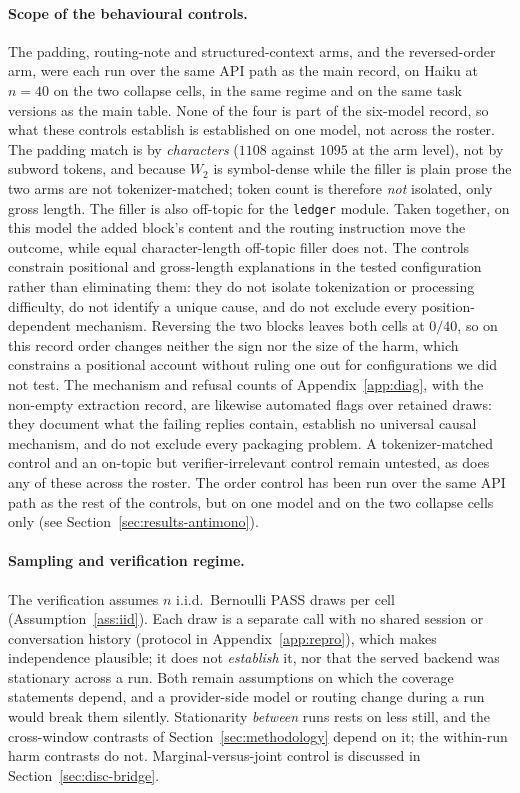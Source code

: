 \documentclass[11pt]{article}
\theoremstyle{plain}
\theoremstyle{definition}
\theoremstyle{remark}
\begin{document}
\paragraph{Scope of the behavioural controls.} The padding, routing-note and structured-context
arms, and the reversed-order arm, were each run over the same API path as the main record, on
Haiku at $n=40$ on the two collapse
cells, in the same regime and on the same task versions as the main table. None of the four is part of the six-model
record, so what these controls establish is established on one model, not across the roster. The
padding match is by \emph{characters} ($1108$ against $1095$ at the arm level), not by subword
tokens, and because $W_2$ is symbol-dense while the filler is plain prose the two arms are not
tokenizer-matched; token count is therefore \emph{not} isolated, only gross length. The filler is
also off-topic for the \texttt{ledger} module. Taken together, on this model the added block's
content and the routing instruction move the outcome, while equal character-length off-topic
filler does not. The controls constrain positional and gross-length explanations in the tested
configuration rather than eliminating them: they do not isolate tokenization or processing
difficulty, do not identify a unique cause, and do not exclude every position-dependent
mechanism. Reversing the two blocks leaves both cells at $0/40$, so on this record order changes
neither the sign nor the size of the harm, which constrains a positional account without ruling
one out for configurations we did not test. The mechanism and
refusal counts of Appendix~\ref{app:diag}, with the non-empty extraction record, are likewise
automated flags over retained draws: they document what the failing replies contain, establish
no universal causal mechanism, and do not exclude every packaging problem. A
tokenizer-matched control and an on-topic but verifier-irrelevant control remain untested, as
does any of these across the roster. The order control has been run over the same API path as the
rest of the controls, but on one model and on the two collapse cells only
(see Section~\ref{sec:results-antimono}).

\paragraph{Sampling and verification regime.} The verification assumes $n$ i.i.d.\ Bernoulli PASS
draws per cell (Assumption~\ref{ass:iid}). Each draw is a separate call with no shared session or
conversation history (protocol in Appendix~\ref{app:repro}), which makes independence plausible;
it does not \emph{establish} it, nor that the served backend was stationary across a run. Both
remain assumptions on which the coverage statements depend, and a provider-side model or routing
change during a run would break them silently. Stationarity \emph{between} runs rests on less
still, and the cross-window contrasts of Section~\ref{sec:methodology} depend on it; the
within-run harm contrasts do not.
Marginal-versus-joint control is discussed in Section~\ref{sec:disc-bridge}.
\end{document}
